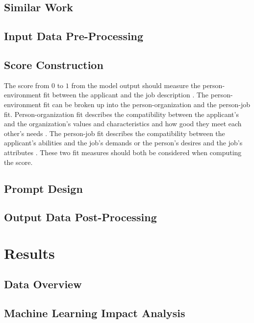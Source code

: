 \documentclass[draft,final]{thesisclass} %
\begin{document}
\section{Similar Work}
\lipsum[1]

\section{Input Data Pre-Processing}
\lipsum[1]

\section{Score Construction}
The score from $0$ to $1$ from the model output should measure the person-environment fit between the applicant and the job description \cite[1]{po_and_pj_fit_literature_review}.
The person-environment fit can be broken up into the person-organization and the person-job fit.
Person-organization fit describes the compatibility between the applicant's and the organization's values and characteristics and how good they meet each other's needs \cite[1]{po_and_pj_fit_literature_review}.
The person-job fit describes the compatibility between the applicant's abilities and the job's demands or the person's desires and the job's attributes \cite[1]{po_and_pj_fit_literature_review}.
These two fit measures should both be considered when computing the score.

\section{Prompt Design}
\lipsum[1]

\section{Output Data Post-Processing}
\lipsum[1]

\chapter{Results}

\section{Data Overview}
\lipsum[1]

\section{Machine Learning Impact Analysis}
\lipsum[1]
\end{document}
